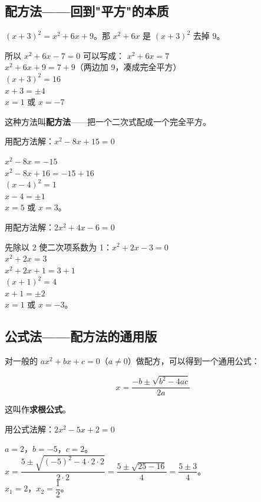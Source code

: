 \subsection*{配方法——回到"平方"的本质}

$(x+3)^2 = x^2 + 6x + 9$。那 $x^2 + 6x$ 是 $(x+3)^2$ 去掉 9。

所以 $x^2 + 6x - 7 = 0$ 可以写成：
$x^2 + 6x = 7$\\
$x^2 + 6x + 9 = 7 + 9$（两边加 9，凑成完全平方）\\
$(x+3)^2 = 16$\\
$x+3 = \pm4$\\
$x = 1$ 或 $x = -7$

这种方法叫\textbf{配方法}——把一个二次式配成一个完全平方。

\begin{example}
用配方法解：$x^2 - 8x + 15 = 0$
\end{example}
\begin{solution}
$x^2 - 8x = -15$\\
$x^2 - 8x + 16 = -15 + 16$\\
$(x-4)^2 = 1$\\
$x-4 = \pm1$\\
$x = 5$ 或 $x = 3$。
\end{solution}

\begin{example}
用配方法解：$2x^2 + 4x - 6 = 0$
\end{example}
\begin{solution}
先除以 2 使二次项系数为 1：$x^2 + 2x - 3 = 0$\\
$x^2 + 2x = 3$\\
$x^2 + 2x + 1 = 3 + 1$\\
$(x+1)^2 = 4$\\
$x+1 = \pm2$\\
$x = 1$ 或 $x = -3$。
\end{solution}

\subsection*{公式法——配方法的通用版}

对一般的 $ax^2 + bx + c = 0$（$a\neq0$）做配方，可以得到一个通用公式：

\[
x = \frac{-b \pm \sqrt{b^2 - 4ac}}{2a}
\]

这叫作\textbf{求根公式}。

\begin{example}
用公式法解：$2x^2 - 5x + 2 = 0$
\end{example}
\begin{solution}
$a=2$，$b=-5$，$c=2$。\\
$x = \dfrac{5 \pm \sqrt{(-5)^2 - 4\cdot2\cdot2}}{2\cdot2} = \dfrac{5 \pm \sqrt{25-16}}{4} = \dfrac{5 \pm 3}{4}$。\\
$x_1 = 2$，$x_2 = \dfrac{1}{2}$。
\end{solution}

